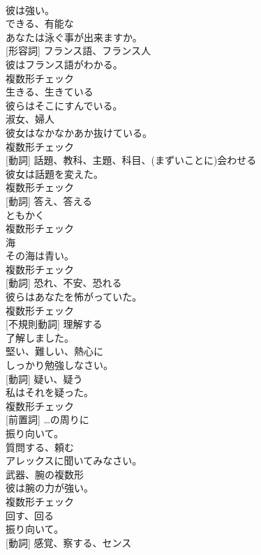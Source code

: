 \documentclass[8pt]{extreport}
\begin{document}
\begin{CJK}{UTF8}{min}
\\	彼は強い。	
\\	[形容詞]	できる、有能な	
\\	あなたは泳ぐ事が出来ますか。	
\\	[名詞] [形容詞]	フランス語、フランス人	
\\	彼はフランス語がわかる。	
\\	複数形チェック
\\	[動詞]	生きる、生きている	
\\	彼らはそこにすんでいる。	
\\	[名詞]	淑女、婦人	
\\	彼女はなかなかあか抜けている。	
\\	複数形チェック
\\	[名詞] [動詞]	話題、教科、主題、科目、(まずいことに)会わせる	
\\	彼女は話題を変えた。	
\\	複数形チェック
\\	[名詞] [動詞]	答え、答える	
\\	ともかく	
\\	複数形チェック
\\	[名詞]	海	
\\	その海は青い。	
\\	複数形チェック
\\	[名詞] [動詞]	恐れ、不安、恐れる	
\\	彼らはあなたを怖がっていた。	
\\	複数形チェック
\\	[動詞] [不規則動詞]	理解する	
\\	了解しました。	
\\	[形容詞]	堅い、難しい、熱心に	
\\	しっかり勉強しなさい。	
\\	[名詞] [動詞]	疑い、疑う	
\\	私はそれを疑った。	
\\	複数形チェック
\\	[副詞] [前置詞]	…の周りに	
\\	振り向いて。	
\\	[動詞]	質問する、頼む	
\\	アレックスに聞いてみなさい。	
\\	[名詞]	武器、腕の複数形	
\\	彼は腕の力が強い。	
\\	複数形チェック
\\	[動詞]	回す、回る	
\\	振り向いて。	
\\	[名詞] [動詞]	感覚、察する、センス	

\end{CJK}
\end{document}
